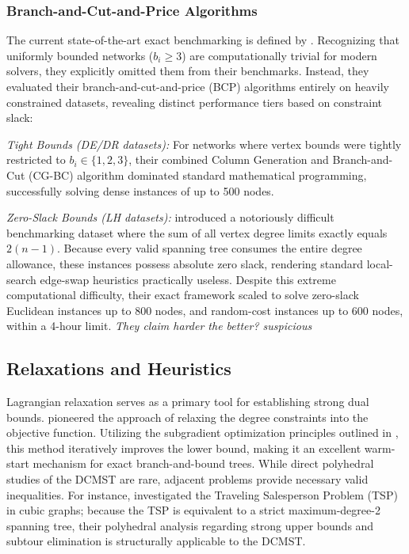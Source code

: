\documentclass[12pt]{article}
\begin{document}
\subsubsection{Branch-and-Cut-and-Price Algorithms}
The current state-of-the-art exact benchmarking is defined by \citet{Bicalho2016}. Recognizing that uniformly bounded networks ($b_i \ge 3$) are computationally trivial for modern solvers, they explicitly omitted them from their benchmarks. Instead, they evaluated their branch-and-cut-and-price (BCP) algorithms entirely on heavily constrained datasets, revealing distinct performance tiers based on constraint slack:

\vspace{0.5cm}
\noindent\textit{Tight Bounds (DE/DR datasets):} For networks where vertex bounds were tightly restricted to $b_i \in \{1, 2, 3\}$, their combined Column Generation and Branch-and-Cut (CG-BC) algorithm dominated standard mathematical programming, successfully solving dense instances of up to 500 nodes.

\vspace{0.5cm}
\noindent\textit{Zero-Slack Bounds (LH datasets):} \citet{Bicalho2016} introduced a notoriously difficult benchmarking dataset where the sum of all vertex degree limits exactly equals $2(n-1)$. Because every valid spanning tree consumes the entire degree allowance, these instances possess absolute zero slack, rendering standard local-search edge-swap heuristics practically useless. Despite this extreme computational difficulty, their exact framework scaled to solve zero-slack Euclidean instances up to 800 nodes, and random-cost instances up to 600 nodes, within a 4-hour limit. \textit{They claim harder the better? suspicious}

\subsection{Relaxations and Heuristics}
 Lagrangian relaxation serves as a primary tool for establishing strong dual bounds. \citet{Volgenant1989} pioneered the approach of relaxing the degree constraints into the objective function. Utilizing the subgradient optimization principles outlined in \citet{Fisher1981}, this method iteratively improves the lower bound, making it an excellent warm-start mechanism for exact branch-and-bound trees. While direct polyhedral studies of the DCMST are rare, adjacent problems provide necessary valid inequalities. For instance, \citet{Gamarnik2005} investigated the Traveling Salesperson Problem (TSP) in cubic graphs; because the TSP is equivalent to a strict maximum-degree-2 spanning tree, their polyhedral analysis regarding strong upper bounds and subtour elimination is structurally applicable to the DCMST.
\end{document}
